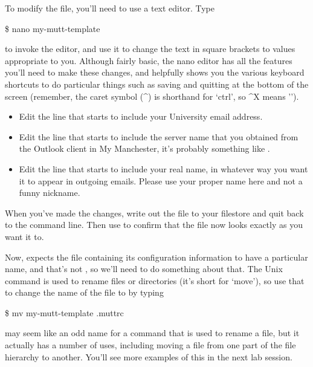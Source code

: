 To modify the file, you'll need to use a text editor. Type 
\begin{ttoutenv}
\$ nano my-mutt-template
\end{ttoutenv}

to invoke the  editor, and use it to change the text in square brackets to values appropriate to you. Although fairly basic, the nano editor has all the features you'll need to make these changes, and helpfully shows you the various keyboard shortcuts to do particular things such as saving and quitting at the bottom of the screen (remember, the caret symbol (\textasciicircum) is shorthand for `ctrl', so \textasciicircum X means '').

\begin{itemize}
\item Edit the line that starts  to include your University email address.
\item Edit the line that starts  to include the server name that you obtained from the Outlook client in My Manchester, it's probably something like .
\item Edit the line that starts  to include your real name, in whatever way you want it to appear in outgoing emails. Please use your proper name here and not a funny nickname.
\end{itemize}

When you've made the changes, write out the file to your filestore and quit back to the command line. Then use  to confirm that the file now looks exactly as you want it to. 

Now,  expects the file containing its configuration information to have a particular name, and that's not , so we'll need to do something about that. The Unix  command is used to rename files or directories (it's short for `move'), so use that to change the name of the file to  by typing


\begin{ttoutenv}
\$ mv my-mutt-template .muttrc
\end{ttoutenv}


 may seem like an odd name for a command that is used to rename a file, but it actually has a number of uses, including moving a file from one part of the file hierarchy to another. You'll see more examples of this in the next lab session.

